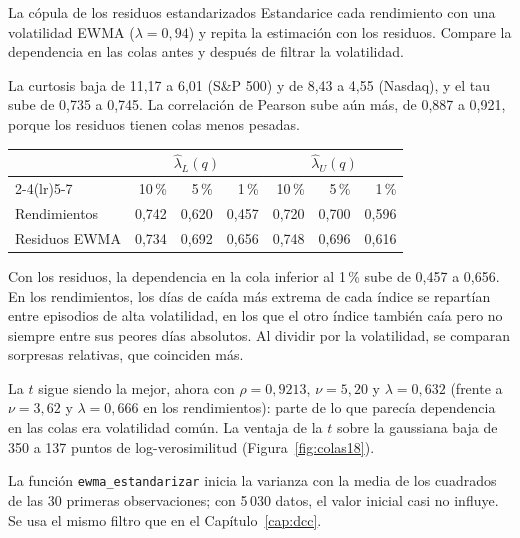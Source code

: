 \begin{ejresuelto}{La cópula de los residuos estandarizados}\label{ej:copres}
\enunciado Estandarice cada rendimiento con una volatilidad EWMA ($\lambda=0{,}94$) y repita la estimación con los residuos.
Compare la dependencia en las colas antes y después de filtrar la volatilidad.

\solucion
{} La curtosis baja de 11,17 a 6,01 (S\&P 500) y de 8,43 a 4,55 (Nasdaq), y el tau sube de 0,735 a
0,745. La correlación de Pearson sube aún más, de 0,887 a 0,921, porque los residuos tienen colas menos pesadas.

\begin{center}\small
\begin{tabular}{@{}lrrrrrr@{}}
\toprule
 & \multicolumn{3}{c}{$\hat\lambda_L(q)$} & \multicolumn{3}{c}{$\hat\lambda_U(q)$} \\
\cmidrule(lr){2-4}\cmidrule(lr){5-7}
 & 10\,\% & 5\,\% & 1\,\% & 10\,\% & 5\,\% & 1\,\% \\
\midrule
Rendimientos & 0,742 & 0,620 & 0,457 & 0,720 & 0,700 & 0,596 \\
Residuos EWMA & 0,734 & 0,692 & 0,656 & 0,748 & 0,696 & 0,616 \\
\bottomrule
\end{tabular}
\end{center}
Con los residuos, la dependencia en la cola inferior al 1\,\% sube de 0,457 a 0,656. En los rendimientos, los días de caída más
extrema de cada índice se repartían entre episodios de alta volatilidad, en los que el otro índice también caía pero no
siempre entre sus peores días absolutos. Al dividir por la volatilidad, se comparan sorpresas relativas, que coinciden más.

 La $t$ sigue siendo la mejor, ahora con $\rho=0{,}9213$, $\nu=5{,}20$ y $\lambda=0{,}632$ (frente a
$\nu=3{,}62$ y $\lambda=0{,}666$ en los rendimientos): parte de lo que parecía dependencia en las colas era volatilidad
común. La ventaja de la $t$ sobre la gaussiana baja de 350 a 137 puntos de log-verosimilitud (Figura~\ref{fig:colas18}).


\RvsPy La función \texttt{ewma\_estandarizar} inicia la varianza con la media de los cuadrados de las 30 primeras observaciones;
con 5\,030 datos, el valor inicial casi no influye. Se usa el mismo filtro que en el Capítulo~\ref{cap:dcc}.


\end{ejresuelto}
